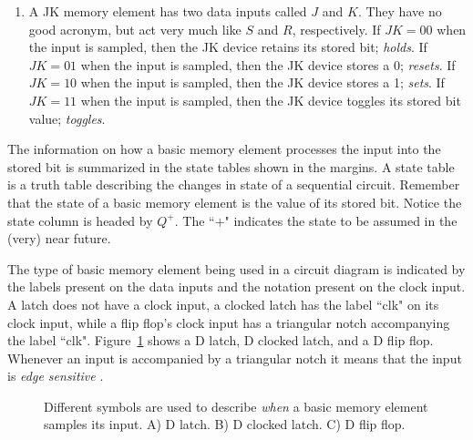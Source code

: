 \begin{enumerate}
\begin{enumerate}
            \item
                A JK memory element has two data inputs called $J$ and $K$. They have
                no good acronym, but act very much like $S$ and $R$, respectively.
                If $JK=00$ when the input is sampled, then the JK device retains
                its stored bit; \textit{ holds}.
                If $JK=01$ when the input is sampled, then the JK device stores a 0; \textit{ resets}.
                If $JK=10$ when the input is sampled, then the JK device stores a 1; \textit{ sets}.
                If $JK=11$ when the input is sampled, then the JK device toggles its
                stored bit value; \textit{ toggles}.
        \end{enumerate}
\end{enumerate}

The information on how a basic memory element processes the input into
the stored bit is summarized in the state tables shown in the margins.
A state table is a truth table describing the changes in state
of a sequential  circuit.  Remember that the state of a basic memory
element is the value of its stored bit.  Notice the state column
is headed by $Q^+$. The ``$+$" indicates the state to be assumed
in the (very) near future.

The type of basic memory element being used in a
circuit diagram is indicated by the labels present on the data inputs and the
notation present on the clock input.  A latch does not have a clock
input, a clocked latch has the label ``clk" on its clock input,
while a flip flop's clock input has a triangular notch accompanying
the label ``clk".  Figure~\ref{fig:sequentialCirdevices} shows a D latch,
D clocked latch, and a D flip flop.  Whenever an input is accompanied
by a triangular notch it means that the input is \textit{ edge sensitive}
.

\begin{figure}[ht]
    \caption{Different symbols are used to describe \textit{ when} a basic
memory element samples its input.  A) D latch. B) D clocked latch.
C) D flip flop.}
\label{fig:sequentialCirdevices}
\end{figure}


